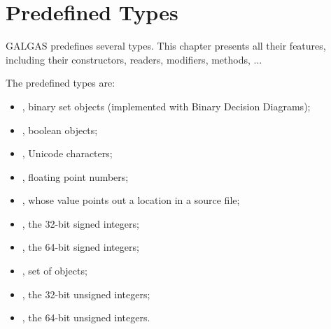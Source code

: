 
\chapter{Predefined Types} \label{predefinedTypes}

GALGAS predefines several types. This chapter presents all their features, including their constructors, readers, modifiers, methods, ...


\begin{description}
\item The predefined types are:
\begin{itemize}
\item {}, binary set objects (implemented with Binary Decision Diagrams);
\item {}, boolean objects;
\item {}, Unicode characters;
\item {}, floating point numbers;
\item {}, whose value points out a location in a source file;
\item {}, the 32-bit signed integers;
\item {}, the 64-bit signed integers;
\item {}, set of  objects;
\item {}, the 32-bit unsigned integers;
\item {}, the 64-bit unsigned integers.
\end{itemize}
\end{description}








%




